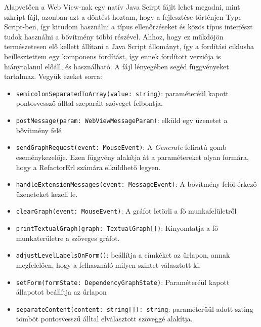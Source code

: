 Alapvetően a Web View-nak egy natív Java Scirpt fájlt lehet megadni, mint szkript fájl, azonban azt a  döntést hoztam, hogy a fejlesztése történjen Type Script-ben, így kitudom használni a típus ellenőrzéseket és közös típus interfészt tudok használni a bővítmény többi részével. Ahhoz, hogy ez műkdöjön természetesen elő kellett állítani a Java Script állományt, így a fordítási ciklusba beillesztettem egy komponens fordítást, így ennek fordított verziója is hiánytalanul előáll, és használható. A fájl lényegében segéd függvényeket tartalmaz. Vegyük ezeket sorra:

\begin{itemize}
    \item \lstinline{semicolonSeparatedToArray(value: string)}: paraméteréül kapott pontosvessző álltal szeparált szöveget felbontja.
    
    \item \lstinline{postMessage(param: WebViewMessageParam)}: elküld egy üzenetet a bővítmény felé
    
    \item \lstinline{sendGraphRequest(event: MouseEvent)}: A \textit{Generate} feliratú gomb eseménykezelője. Ezen függvény alakítja át a paramétereket olyan formára, hogy a RefactorErl számára elküldhető legyen.
    
    \item \lstinline{handleExtensionMessages(event: MessageEvent)}: A bővítmény felől érkező üzeneteket kezeli le.
    
    \item \lstinline{clearGraph(event: MouseEvent)}: A gráfot letörli a fő munkafelületről
    
    \item \lstinline{printTextualGraph(graph: TextualGraph[])}: Kinyomtatja a fő munkaterületre a szöveges gráfot.
    
    \item \lstinline{adjustLevelLabelsOnForm()}: beállítja a címkéket az űrlapon, annak megfelelően, hogy a felhasználó milyen szintet választott ki.
    
    \item \lstinline{setForm(formState: DependencyGraphState)}: Paraméteréül kapott állapotot beállítja az űrlapon
    
    \item \lstinline{separateContent(content: string[]): string}: paraméterűül adott szting tömböt pontosvesszű álltal elválasztott szöveggé alakítja.
    
\end{itemize}


